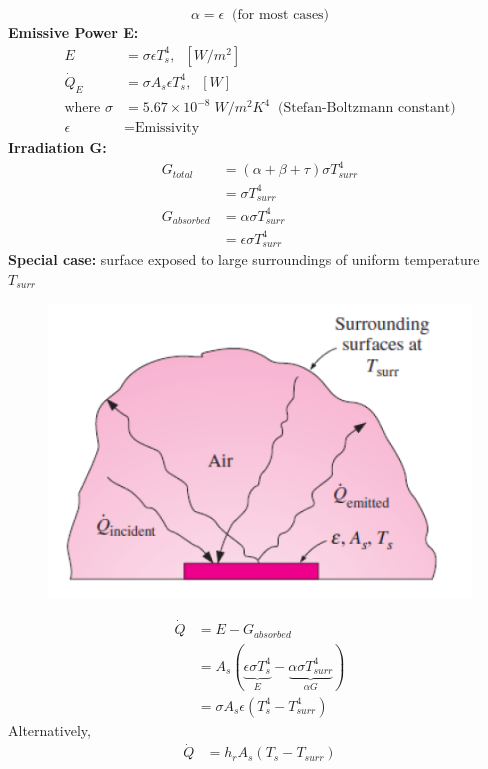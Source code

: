 \begin{itemize}
    \begin{equation*}
        \alpha = \epsilon \; \; \text{(for most cases)}
    \end{equation*}
    \textbf{Emissive Power E:} 
    \begin{align*}
        E &= \sigma \epsilon T_{s}^{4}, \; \; [W/m^2] \\
        \dot{Q}_E &= \sigma A_s \epsilon T_s^4, \; \; [W]\\
        \text{where } \sigma &= 5.67\times 10^{-8} \; W/m^2 K^4 \; \; \text{(Stefan-Boltzmann constant)} \\
        \epsilon &= \text{Emissivity} 
    \end{align*}
    \textbf{Irradiation G:}
    \begin{align*}
        G_{total} &= (\alpha + \beta + \tau) \sigma T_{surr}^4 \\
        &= \sigma T_{surr}^4 \\
        G_{absorbed} &= \alpha \sigma T_{surr}^4 \\
        &= \epsilon \sigma T_{surr}^4
    \end{align*}
    \textbf{Special case:} surface exposed to large surroundings of uniform temperature $T_{surr}$
    \begin{figure}[h]
        \centering
        \includegraphics[width=0.7\linewidth]{images/radiation_special_case.png}
    \end{figure}
    \begin{align*}
        \dot{Q} &= E- G_{absorbed} \\
        &= A_s \left(\underbrace{\epsilon \sigma T_s^4}_{E} - \underbrace{\alpha \sigma T_{surr}^4}_{\alpha G}\right) \\
        &= \sigma A_s \epsilon (T_s^4 - T_{surr}^4)
    \end{align*}
    Alternatively,
    \begin{align*}
        \dot{Q} &= h_r A_s (T_s - T_{surr} ) \\

\end{align*}
\end{itemize}
